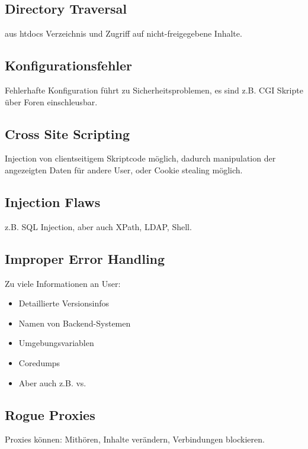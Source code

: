 \subsection{Directory Traversal}
 aus htdocs Verzeichnis und Zugriff auf nicht-freigegebene Inhalte.

\subsection{Konfigurationsfehler}
Fehlerhafte Konfiguration führt zu Sicherheitsproblemen, es sind z.B. CGI Skripte über Foren einschleusbar.

\subsection{Cross Site Scripting}
Injection von clientseitigem Skriptcode möglich, dadurch manipulation der angezeigten Daten für andere User, oder Cookie stealing möglich.

\subsection{Injection Flaws}
z.B. SQL Injection, aber auch XPath, LDAP, Shell.

\subsection{Improper Error Handling}
Zu viele Informationen an User:
\begin{itemize}
    \item Detaillierte Versionsinfos
    \item Namen von Backend-Systemen
    \item Umgebungsvariablen
    \item Coredumps
    \item Aber auch z.B.  vs. 
\end{itemize}

\subsection{Rogue Proxies}
Proxies können: Mithören, Inhalte verändern, Verbindungen blockieren.

